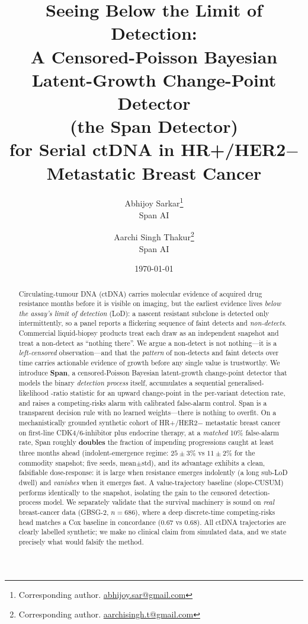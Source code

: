 \documentclass[11pt]{article}
\title{\vspace{-1.2cm}\bfseries Seeing Below the Limit of Detection:\\
A Censored-Poisson Bayesian Latent-Growth Change-Point Detector\\
(the \textbf{Span} Detector)\\
for Serial ctDNA in HR+/HER2$-$ Metastatic Breast Cancer}
\author{
  Abhijoy Sarkar\thanks{Corresponding author. \href{mailto:abhijoy.sar@gmail.com}{abhijoy.sar@gmail.com}}\\
  Span AI
  \and
  Aarchi Singh Thakur\thanks{Corresponding author. \href{mailto:aarchisingh.t@gmail.com}{aarchisingh.t@gmail.com}}\\
  Span AI
}
\date{\today}
\newcommand{\1}{\mathbf{1}}
\begin{document}
\maketitle

\begin{abstract}
\noindent
Circulating-tumour DNA (ctDNA) carries molecular evidence of acquired drug
resistance months before it is visible on imaging, but the earliest evidence
lives \emph{below the assay's limit of detection} (LoD): a nascent resistant
subclone is detected only intermittently, so a panel reports a flickering
sequence of faint detects and \emph{non-detects}. Commercial liquid-biopsy
products treat each draw as an independent snapshot and treat a non-detect as
``nothing there''. We argue a non-detect is not nothing---it is a
\emph{left-censored} observation---and that the \emph{pattern} of non-detects
and faint detects over time carries actionable evidence of growth before any
single value is trustworthy. We introduce \textbf{Span}, a censored-Poisson
Bayesian latent-growth change-point detector that models the binary
\emph{detection process} itself, accumulates a sequential generalised-likelihood
-ratio statistic for an upward change-point in the per-variant detection rate,
and raises a competing-risks alarm with calibrated false-alarm control. Span
is a transparent decision rule with no learned weights---there is nothing to
overfit. On a mechanistically grounded synthetic cohort of HR+/HER2$-$
metastatic breast cancer on first-line CDK4/6-inhibitor plus endocrine therapy,
at a \emph{matched} 10\% false-alarm rate, Span roughly \textbf{doubles} the
fraction of impending progressions caught at least three months ahead
(indolent-emergence regime: $25\pm3\%$ vs $11\pm2\%$ for the commodity snapshot;
five seeds, mean$\pm$std), and its advantage exhibits a clean, falsifiable
dose-response: it is large when resistance emerges indolently (a long sub-LoD
dwell) and \emph{vanishes} when it emerges fast. A value-trajectory baseline
(slope-CUSUM) performs identically to the snapshot, isolating the gain to the
censored detection-process model. We separately validate that the survival
machinery is sound on \emph{real} breast-cancer data (GBSG-2, $n{=}686$), where a
deep discrete-time competing-risks head matches a Cox baseline in concordance
($0.67$ vs $0.68$). All ctDNA trajectories are clearly labelled synthetic; we
make no clinical claim from simulated data, and we state precisely what would
falsify the method.
\end{abstract}
\end{document}
